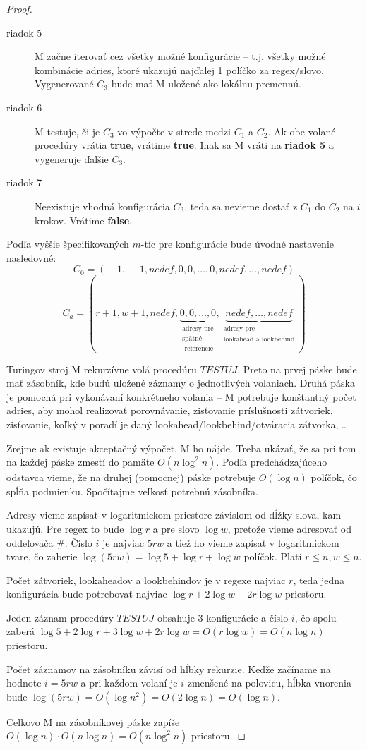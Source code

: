 \begin{proof}
\begin{description}
\item[riadok 5] M začne iterovať cez všetky možné konfigurácie -- t.j. všetky možné kombinácie adries, ktoré ukazujú najďalej 1 políčko za regex/slovo. Vygenerované $C_3$ bude mať M uložené ako lokálnu premennú.
\item[riadok 6] M testuje, či je $C_3$ vo výpočte v strede medzi $C_1$ a $C_2$. Ak obe volané procedúry vrátia \textbf{true}, vrátime \textbf{true}. Inak sa M vráti na \textbf{riadok 5} a vygeneruje ďalšie $C_3$.
\item[riadok 7] Neexistuje vhodná konfigurácia $C_3$, teda sa nevieme dostať z $C_1$ do $C_2$ na $i$ krokov. Vrátime \textbf{false}.
\end{description}

Podľa vyššie špecifikovaných $m$-tíc pre konfigurácie bude úvodné nastavenie nasledovné: $$C_0=(~~~~~1,~~~~~~1,nedef,0,0,\dots,0,nedef,\dots,nedef)$$
$$C_a=(r+1,w+1,nedef,\underbrace{0,0,\dots,0}_{\substack{\text{adresy pre}\\\text{spätné}\\\text{ referencie}}},\underbrace{nedef,\dots,nedef}_{\substack{\text{adresy pre}\\\text{lookahead a lookbehind}}})$$

Turingov stroj M rekurzívne volá procedúru $TESTUJ$. Preto na prvej páske bude mať zásobník, kde budú uložené záznamy o jednotlivých volaniach. Druhá páska je pomocná pri vykonávaní konkrétneho volania -- M potrebuje konštantný počet adries, aby mohol realizovať porovnávanie, zisťovanie príslušnosti zátvoriek, zisťovanie, koľký v poradí je daný lookahead/lookbehind/otváracia zátvorka, \dots

Zrejme ak existuje akceptačný výpočet, M ho nájde. Treba ukázať, že sa pri tom na každej páske zmestí do pamäte $O(n\log^2 n)$. Podľa predchádzajúceho odstavca vieme, že na druhej (pomocnej) páske potrebuje $O(\log n)$ políčok, čo spĺňa podmienku. Spočítajme veľkosť potrebnú zásobníka.

Adresy vieme zapísať v logaritmickom priestore závislom od dĺžky slova, kam ukazujú. Pre regex to bude $\log r$ a pre slovo $\log w$, pretože vieme adresovať od oddeľovača \#. Číslo $i$ je najviac $5rw$ a tiež ho vieme zapísať v logaritmickom tvare, čo zaberie $\log (5rw) = \log 5 + \log r + \log w$ políčok. Platí $r\leq n, w\leq n$.

Počet zátvoriek, lookaheadov a lookbehindov je v regexe najviac $r$, teda jedna konfigurácia bude potrebovať najviac $\log r + 2\log w + 2r\log w$ priestoru.

Jeden záznam procedúry $TESTUJ$ obsahuje 3 konfigurácie a číslo $i$, čo spolu zaberá $\log 5+2\log r + 3\log w + 2r\log w = O(r\log w) = O(n\log n)$ priestoru.

Počet záznamov na zásobníku závisí od hĺbky rekurzie. Keďže začíname na hodnote $i=5rw$ a pri každom volaní je $i$ zmenšené na polovicu, hĺbka vnorenia bude $\log(5rw)=O(\log n^2) = O(2\log n) = O(\log n)$.

Celkovo M na zásobníkovej páske zapíše $O(\log n)\cdot O(n\log n) = O(n\log^2 n)$ priestoru.
\end{proof}


